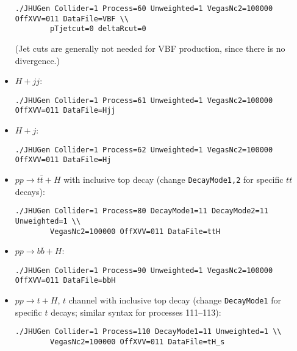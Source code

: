 \documentclass[aps,superscriptaddress,nofootinbib]{revtex4}
\begin{document}
\begin{itemize}
\begin{verbatim}
./JHUGen Collider=1 Process=60 Unweighted=1 VegasNc2=100000 OffXVV=011 DataFile=VBF \\
		pTjetcut=0 deltaRcut=0
\end{verbatim}
(Jet cuts are generally not needed for VBF production, since there is no divergence.)
\item $H+jj$:
\begin{verbatim}
./JHUGen Collider=1 Process=61 Unweighted=1 VegasNc2=100000 OffXVV=011 DataFile=Hjj
\end{verbatim}
\item $H+j$:
\begin{verbatim}
./JHUGen Collider=1 Process=62 Unweighted=1 VegasNc2=100000 OffXVV=011 DataFile=Hj
\end{verbatim}
\item $pp \to t\bar{t}+H$ with inclusive top decay (change \verb|DecayMode1,2| for specific $tt$ decays):
\begin{verbatim}
./JHUGen Collider=1 Process=80 DecayMode1=11 DecayMode2=11 Unweighted=1 \\
		VegasNc2=100000 OffXVV=011 DataFile=ttH
\end{verbatim}
\item $pp \to b\bar{b}+H$:
\begin{verbatim}
./JHUGen Collider=1 Process=90 Unweighted=1 VegasNc2=100000 OffXVV=011 DataFile=bbH
\end{verbatim}
\item $pp \to t+H$, $t$ channel with inclusive top decay (change \verb|DecayMode1| for specific $t$ decays; similar syntax for processes 111--113):
\begin{verbatim}
./JHUGen Collider=1 Process=110 DecayMode1=11 Unweighted=1 \\
		VegasNc2=100000 OffXVV=011 DataFile=tH_s
\end{verbatim}
\end{itemize}

\end{document}
